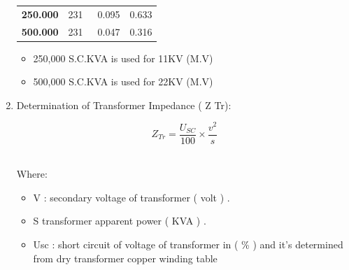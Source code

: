 \documentclass[12pt,fleqn]{book} %
\begin{document}
\begin{enumerate}
\begin{table}[h!]
\begin{tabular}{!{\color[rgb]{0.584,0.702,0.843}\vrule}l!{\color{black}\vrule}l!{\color[rgb]{0.584,0.702,0.843}\vrule}l!{\color[rgb]{0.584,0.702,0.843}\vrule}l!{\color[rgb]{0.584,0.702,0.843}\vrule}}
 \textbf{250.000}                                                                             & 231~                                                       & 0.095                                                       & 0.633                                                                                              \\ 
\hline
\textbf{500.000}                                                                                                               & 231                                                        & 0.047                                                       & 0.316                                                                                              \\
\hline
\end{tabular}
\end{table}
\begin{itemize}
    \item 250,000 S.C.KVA is used for 11KV (M.V)
    \item 500,000 S.C.KVA is used for 22KV (M.V)
\end{itemize}
            \item 	Determination of Transformer Impedance ( Z Tr):
          
            \begin{equation}
                 Z_{Tr}=\frac{U_{SC}}{ 100} \times \frac{v^2}{ s}
            \end{equation}
      
            \\Where:
            \begin{itemize}
    \item  V : secondary voltage of transformer ( volt ) .
    \item S transformer apparent power ( KVA ) . 
     \item Usc : short circuit of voltage of transformer in ( \% ) and it's determined from dry transformer copper winding table 
\end{itemize}
            

\end{enumerate}
\end{document}
